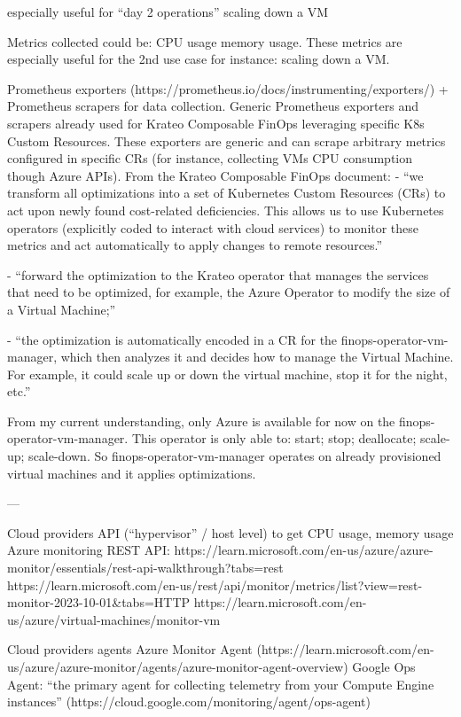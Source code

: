 especially useful for ``day 2 operations''
scaling down a VM


Metrics collected could be:
CPU usage
memory usage.
These metrics are especially useful for the 2nd use case for instance: scaling down a VM.


Prometheus exporters (https://prometheus.io/docs/instrumenting/exporters/) + Prometheus scrapers for data collection.
Generic Prometheus exporters and scrapers already used for Krateo Composable FinOps leveraging specific K8s Custom Resources. These exporters are generic and can scrape arbitrary metrics configured in specific CRs (for instance, collecting VMs CPU consumption though Azure APIs).
From the Krateo Composable FinOps document: 
- “we transform all optimizations into a set of Kubernetes Custom Resources (CRs) to act upon newly found cost-related deficiencies. This allows us to use Kubernetes operators (explicitly coded to interact with cloud services) to monitor these metrics and act automatically to apply changes to remote resources.”

- “forward the optimization to the Krateo operator that manages the services that need to be optimized, for example, the Azure Operator to modify the size of a Virtual Machine;”

- “the optimization is automatically encoded in a CR for the finops-operator-vm-manager, which then analyzes it and decides how to manage the Virtual Machine. For example, it could scale up or down the virtual machine, stop it for the night, etc.”

From my current understanding, only Azure is available for now on the finops-operator-vm-manager. 
This operator is only able to: start; stop; deallocate; scale-up; scale-down.
So finops-operator-vm-manager operates on already provisioned virtual machines and it applies optimizations.

---



Cloud providers API (“hypervisor” / host level) to get CPU usage, memory usage
Azure monitoring REST API: https://learn.microsoft.com/en-us/azure/azure-monitor/essentials/rest-api-walkthrough?tabs=rest%
https://learn.microsoft.com/en-us/rest/api/monitor/metrics/list?view=rest-monitor-2023-10-01&tabs=HTTP
https://learn.microsoft.com/en-us/azure/virtual-machines/monitor-vm 


Cloud providers agents
Azure Monitor Agent (https://learn.microsoft.com/en-us/azure/azure-monitor/agents/azure-monitor-agent-overview)
Google Ops Agent: “the primary agent for collecting telemetry from your Compute Engine instances” (https://cloud.google.com/monitoring/agent/ops-agent)


